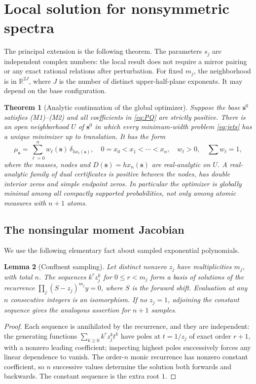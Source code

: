 \documentclass[11pt]{article}
\newtheorem{theorem}{Theorem}[section]
\newtheorem{lemma}[theorem]{Lemma}
\theoremstyle{remark}\newtheorem{remark}[theorem]{Remark}
\newcommand{\R}{\mathbb R}\newcommand{\C}{\mathbb C}\newcommand{\supp}{\operatorname{supp}}\newcommand{\diam}{\operatorname{diam}}\newcommand{\res}{\operatorname{Res}}\newcommand{\Ree}{\operatorname{Re}}\newcommand{\Imm}{\operatorname{Im}}\newcommand{\dd}{\,\mathrm d}
\begin{document}
\section{Local solution for nonsymmetric spectra}
The principal extension is the following theorem. The parameters $s_j$ are independent complex numbers: the local result does not require a mirror pairing or any exact rational relations after perturbation. For fixed $m_j$, the neighborhood is in $\R^{2J}$, where $J$ is the number of distinct upper-half-plane exponents. It may depend on the base configuration.

\begin{theorem}[Analytic continuation of the global optimizer]\label{thm:local}
Suppose the base $\boldsymbol{s}^0$ satisfies (M1)--(M2) and all coefficients in \eqref{eq:PQ} are strictly positive. There is an open neighborhood $U$ of $\boldsymbol{s}^0$ in which every minimum-width problem \eqref{eq:jets} has a unique minimizer up to translation. It has the form
\begin{equation}\label{eq:localmeasure}
 \mu_{\boldsymbol{s}}=\sum_{\ell=0}^n w_\ell(\boldsymbol{s})\,\delta_{h x_\ell(\boldsymbol{s})},\quad
 0=x_0<x_1<\cdots<x_n,\quad w_\ell>0,\quad \sum w_\ell=1,
\end{equation}
where the masses, nodes and $D(\boldsymbol{s})=h x_n(\boldsymbol{s})$ are real-analytic on $U$. A real-analytic family of dual certificates is positive between the nodes, has double interior zeros and simple endpoint zeros. In particular the optimizer is globally minimal among all compactly supported probabilities, not only among atomic measures with $n+1$ atoms.
\end{theorem}

\subsection{The nonsingular moment Jacobian}
We use the following elementary fact about sampled exponential polynomials.
\begin{lemma}[Confluent sampling]\label{lem:sample}
Let distinct nonzero $z_j$ have multiplicities $m_j$, with total $n$. The sequences $k^r z_j^k$ for $0\le r<m_j$ form a basis of solutions of the recurrence $\prod_j(S-z_j)^{m_j}y=0$, where $S$ is the forward shift. Evaluation at any $n$ consecutive integers is an isomorphism. If no $z_j=1$, adjoining the constant sequence gives the analogous assertion for $n+1$ samples.
\end{lemma}
\begin{proof}
Each sequence is annihilated by the recurrence, and they are independent: the generating functions $\sum_{k\ge0}k^r z_j^k t^k$ have poles at $t=1/z_j$ of exact order $r+1$, with a nonzero leading coefficient; inspecting highest poles successively forces any linear dependence to vanish. The order-$n$ monic recurrence has nonzero constant coefficient, so $n$ successive values determine the solution both forwards and backwards. The constant sequence is the extra root $1$.
\end{proof}
\end{document}
